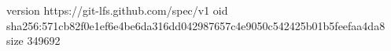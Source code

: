 version https://git-lfs.github.com/spec/v1
oid sha256:571cb82f0e1ef6e4be6da316dd042987657c4e9050c542425b01b5feefaa4da8
size 349692
